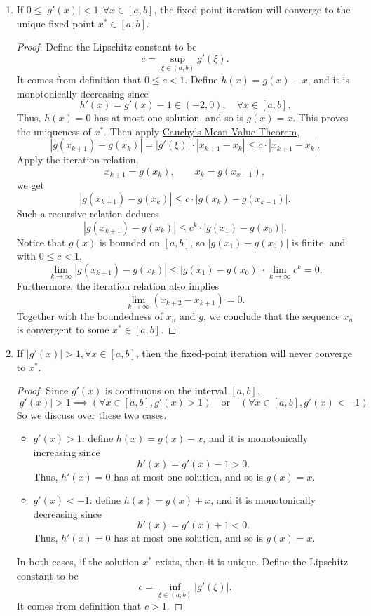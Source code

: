 \begin{enumerate}
	\item If \(0\leq|g'(x)|<1, \forall x\in[a,b]\), the fixed-point iteration will converge to the unique fixed point \(x^*\in[a,b]\).
	\begin{proof}
	Define the Lipschitz constant to be
	\[ c=\sup_{\xi\in(a,b)} g'(\xi). \]
	It comes from definition that \(0\leq c<1\).
	Define \(h(x)=g(x)-x\), and it is monotonically decreasing since
	\[ h'(x)=g'(x)-1\in(-2,0), \quad \forall x\in[a,b]. \]
	Thus, \(h(x)=0\) has at most one solution, and so is \(g(x)=x\).
	This proves the uniqueness of \(x^*\).
	Then apply \hyperref[cauchymean]{Cauchy's Mean Value Theorem},
	\[ |g(x_{k+1})-g(x_k)|=|g'(\xi)|\cdot|x_{k+1}-x_k|\leq c\cdot|x_{k+1}-x_k|. \]
	Apply the iteration relation,
	\[ x_{k+1}=g(x_k), \qquad x_k=g(x_{x-1}), \]
	we get
	\[ |g(x_{k+1})-g(x_k)|\leq c\cdot|g(x_k)-g(x_{k-1})|. \]
	Such a recursive relation deduces
	\[ |g(x_{k+1})-g(x_k)|\leq c^k\cdot|g(x_1)-g(x_0)|. \]
	Notice that \(g(x)\) is bounded on \([a,b]\), so \(|g(x_1)-g(x_0)|\) is finite, and with \(0\leq c<1\),
	\[ \lim_{k\to\infty}|g(x_{k+1})-g(x_k)|\leq |g(x_1)-g(x_0)|\cdot\lim_{k\to\infty}c^k=0. \]
	Furthermore, the iteration relation also implies
	\[ \lim_{k\to\infty}(x_{k+2}-x_{k+1})=0. \]
	Together with the boundedness of \(x_n\) and \(g\), we conclude that the sequence \(x_n\) is convergent to some \(x^*\in[a,b]\).
	\end{proof}
	\item If \(|g'(x)|>1, \forall x\in[a,b]\), then the fixed-point iteration will never converge to \(x^*\).
	\begin{proof}
	Since \(g'(x)\) is continuous on the interval \([a,b]\),
	\[ |g'(x)|>1 \implies (\forall x\in[a,b], g'(x)>1) \quad \text{or} \quad (\forall x\in[a,b], g'(x)<-1) \]
	So we discuss over these two cases.
	\begin{itemize}
		\item{\(g'(x)>1\):} define \(h(x)=g(x)-x\), and it is monotonically increasing since
		\[ h'(x)=g'(x)-1>0. \]
		Thus, \(h'(x)=0\) has at most one solution, and so is \(g(x)=x\).
		\item{\(g'(x)<-1\):} define \(h(x)=g(x)+x\), and it is monotonically decreasing since
		\[ h'(x)=g'(x)+1<0. \]
		Thus, \(h'(x)=0\) has at most one solution, and so is \(g(x)=x\).
	\end{itemize}
	In both cases, if the solution \(x^*\) exists, then it is unique.
	Define the Lipschitz constant to be
	\[ c=\inf_{\xi\in(a,b)} |g'(\xi)|. \]
	It comes from definition that \(c>1\).

\end{proof}
\end{enumerate}
